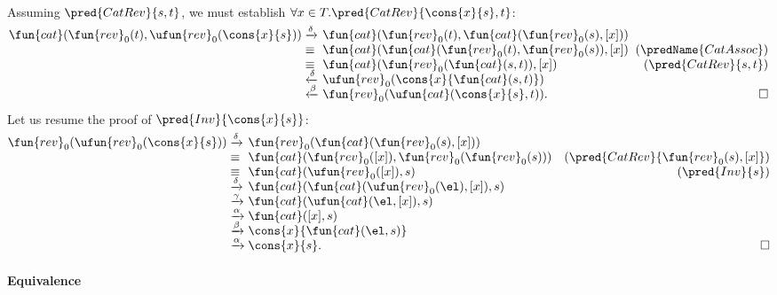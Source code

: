 \noindent Assuming
\(\pred{CatRev}{s,t}\), we must
establish \(\forall x \in T.\pred{CatRev}{\cons{x}{s},t}\):
 
\begin{equation*}
\begin{array}{@{}r@{\;}l@{\;}l@{\;\;}r@{}}
  \fun{cat}(\fun{rev}_0(t),\ufun{rev}_0(\cons{x}{s}))
& \xrightarrow{\smash{\delta}}
& \fun{cat}(\fun{rev}_0(t),\fun{cat}(\fun{rev}_0(s),[x]))\\
& \equiv
& \fun{cat}(\fun{cat}(\fun{rev}_0(t),\fun{rev}_0(s)),[x])
& (\predName{CatAssoc})\\
& \equiv
& \fun{cat}(\fun{rev}_0(\fun{cat}(s,t)),[x])
& (\pred{CatRev}{s,t})\\
& \xleftarrow{\smash{\delta}}
& \ufun{rev}_0(\cons{x}{\fun{cat}(s,t)})\\
& \xleftarrow{\smash{\beta}}
& \fun{rev}_0(\ufun{cat}(\cons{x}{s},t)).
& \hfill \Box
\end{array}
\end{equation*}
Let us resume the proof of
\(\pred{Inv}{\cons{x}{s}}\):
\begin{equation*}
\begin{array}{@{}r@{\;}l@{\;}l@{\quad}r@{}}
  \fun{rev}_0(\ufun{rev}_0(\cons{x}{s}))
& \xrightarrow{\smash{\delta}}
& \fun{rev}_0(\fun{cat}(\fun{rev}_0(s),[x]))\\
& \equiv
& \fun{cat}(\fun{rev}_0([x]),\fun{rev}_0(\fun{rev}_0(s)))
& (\pred{CatRev}{\fun{rev}_0(s),[x]})\\
& \equiv
& \fun{cat}(\ufun{rev}_0([x]),s)
& (\pred{Inv}{s})\\
& \xrightarrow{\smash{\delta}}
& \fun{cat}(\fun{cat}(\ufun{rev}_0(\el),[x]),s)\\
& \xrightarrow{\smash{\gamma}}
& \fun{cat}(\ufun{cat}(\el,[x]),s)\\
& \xrightarrow{\smash{\alpha}}
& \fun{cat}([x],s)\\
& \xrightarrow{\smash{\beta}}
& \cons{x}{\fun{cat}(\el,s)}\\
& \xrightarrow{\smash{\alpha}}
& \cons{x}{s}.
& \hfill \Box
\end{array}
\end{equation*}

\paragraph{Equivalence}

